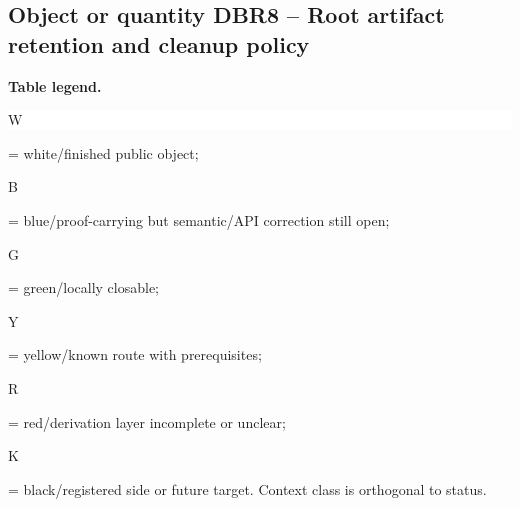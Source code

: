 \subsection*{Object or quantity DBR8 -- Root artifact retention and cleanup policy}
\hypertarget{objproof:DBR8}{}
\par\smallskip\noindent\begin{minipage}{0.99\linewidth}\footnotesize\raggedright\textbf{Table legend.} \colorbox{white}{\strut W} = white/finished public object; \colorbox{cyan!20}{\strut B} = blue/proof-carrying but semantic/API correction still open; \colorbox{green!18}{\strut G} = green/locally closable; \colorbox{yellow!25}{\strut Y} = yellow/known route with prerequisites; \colorbox{red!20}{\strut R} = red/derivation layer incomplete or unclear; \colorbox{black!18}{\strut K} = black/registered side or future target. Context class is orthogonal to status.\end{minipage}\par\vspace{0.25em}
